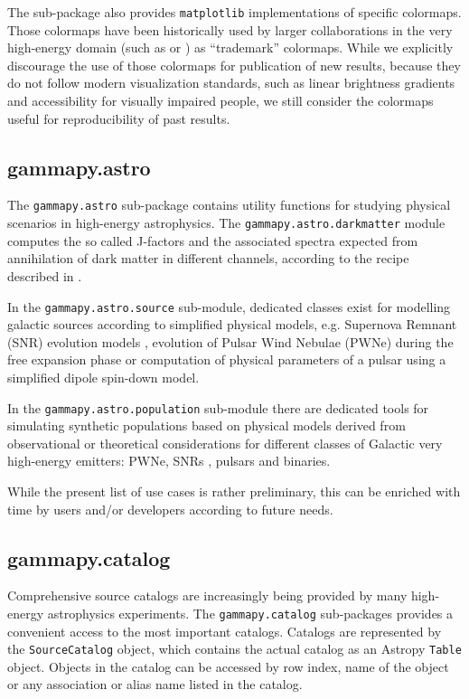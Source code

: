 \documentclass[longauth]{aa}
\newcommand{\code}[1]{\texttt{#1}}
\begin{document}
The sub-package also provides \texttt{matplotlib} implementations of specific
colormaps. Those colormaps have been historically used by larger collaborations
in the very high-energy domain (such as \milagro or \hess) as \enquote{trademark}
colormaps. While we explicitly discourage the use of those colormaps for publication
of new results, because they do not follow modern visualization
standards, such as linear brightness gradients and accessibility
for visually impaired people, we still consider the colormaps
useful for reproducibility of past results.

\subsection{gammapy.astro}
\label{ssec:gammapy-astro}
The \code{gammapy.astro} sub-package contains utility functions for studying physical
scenarios in high-energy astrophysics. The \code{gammapy.astro.darkmatter} module
computes the so called J-factors and the associated \gammaray spectra expected
from annihilation of dark matter in different channels, according to the recipe
described in \cite{2011JCAP...03..051C}.

In the \code{gammapy.astro.source} sub-module, dedicated classes exist for modelling
galactic \gammaray sources according to simplified physical models, e.g. Supernova Remnant (SNR) evolution
models \citep{1950RSPSA.201..159T, 1999ApJS..120..299T}, evolution of Pulsar Wind Nebulae (PWNe) during the
free expansion phase \citep{2006ARA&A..44...17G} or computation
of physical parameters of a pulsar using a simplified dipole spin-down model.

In the \code{gammapy.astro.population} sub-module there are dedicated tools
for simulating synthetic populations based on physical models derived from
observational or theoretical considerations for different classes of Galactic
very high-energy \gammaray emitters: PWNe, SNRs \cite{1998ApJ...504..761C},
pulsars \cite{2006ApJ...643..332F, 2006MNRAS.372..777L, 2004A&A...422..545Y}
and \gammaray binaries.

While the present list of use cases is rather preliminary, this can be enriched
with time by users and/or developers according to future needs.

\subsection{gammapy.catalog}
\label{ssec:gammapy-catalog}
Comprehensive source catalogs are increasingly being provided by many high-energy
astrophysics experiments. The \code{gammapy.catalog} sub-packages
provides a convenient access to the most important \gammaray catalogs.
Catalogs are represented by the \code{SourceCatalog} object, which
contains the actual catalog as an Astropy \code{Table} object.
Objects in the catalog can be accessed by row index, name of the
object or any association or alias name listed in the catalog.
\end{document}

